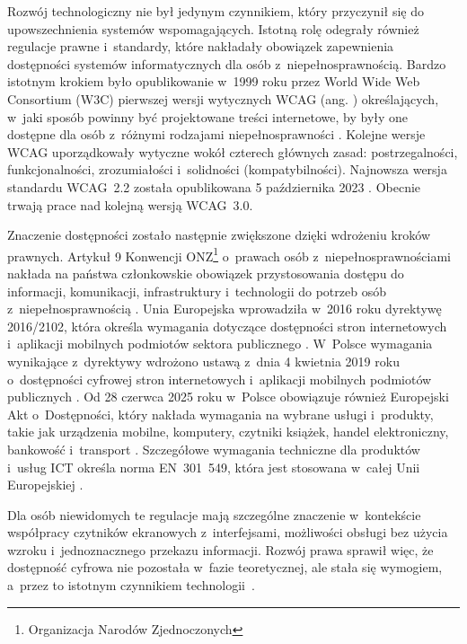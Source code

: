 Rozwój technologiczny nie był jedynym czynnikiem, który przyczynił się do upowszechnienia systemów wspomagających. Istotną rolę odegrały również regulacje prawne i~standardy, które nakładały obowiązek zapewnienia dostępności systemów informatycznych dla osób z~niepełnosprawnością. Bardzo istotnym krokiem było opublikowanie w~1999 roku przez World Wide Web Consortium (W3C) pierwszej wersji wytycznych WCAG (ang. ) określających, w~jaki sposób powinny być projektowane treści internetowe, by były one dostępne dla osób z~różnymi rodzajami niepełnosprawności \cite{bib:wcag1}. Kolejne wersje WCAG uporządkowały wytyczne wokół czterech głównych zasad: postrzegalności, funkcjonalności, zrozumiałości i~solidności (kompatybilności). Najnowsza wersja standardu WCAG~2.2 została opublikowana 5 października 2023 \cite{bib:wcag22}. Obecnie trwają prace nad kolejną wersją WCAG~3.0.

Znaczenie dostępności zostało następnie zwiększone dzięki wdrożeniu kroków prawnych. Artykuł 9 Konwencji ONZ\footnote{Organizacja Narodów Zjednoczonych} o~prawach osób z~niepełnosprawnościami nakłada na państwa członkowskie obowiązek przystosowania dostępu do informacji, komunikacji, infrastruktury i~technologii do potrzeb osób z~niepełnosprawnością \cite{bib:crpd}. Unia Europejska wprowadziła w~2016 roku dyrektywę 2016/2102, która określa wymagania dotyczące dostępności stron internetowych i~aplikacji mobilnych podmiotów sektora publicznego \cite{bib:directive2016accessibility}. W~Polsce wymagania wynikające z~dyrektywy wdrożono ustawą z~dnia 4 kwietnia 2019 roku o~dostępności cyfrowej stron internetowych i~aplikacji mobilnych podmiotów publicznych \cite{bib:ustawaDostepnosc2019}. Od 28 czerwca 2025 roku w~Polsce obowiązuje również Europejski Akt o~Dostępności, który nakłada wymagania na wybrane usługi i~produkty, takie jak urządzenia mobilne, komputery, czytniki książek, handel elektroniczny, bankowość i~transport \cite{bib:eaa2019, bib:polskiAktDostepnosci2024}. Szczegółowe wymagania techniczne dla produktów i~usług ICT określa norma EN~301~549, która jest stosowana w~całej Unii Europejskiej \cite{bib:en301549}.

Dla osób niewidomych te regulacje mają szczególne znaczenie w~kontekście współpracy czytników ekranowych z~interfejsami, możliwości obsługi bez użycia wzroku i~jednoznacznego przekazu informacji. Rozwój prawa sprawił więc, że dostępność cyfrowa nie pozostała w~fazie teoretycznej, ale stała się wymogiem, a~przez to istotnym czynnikiem technologii~.


